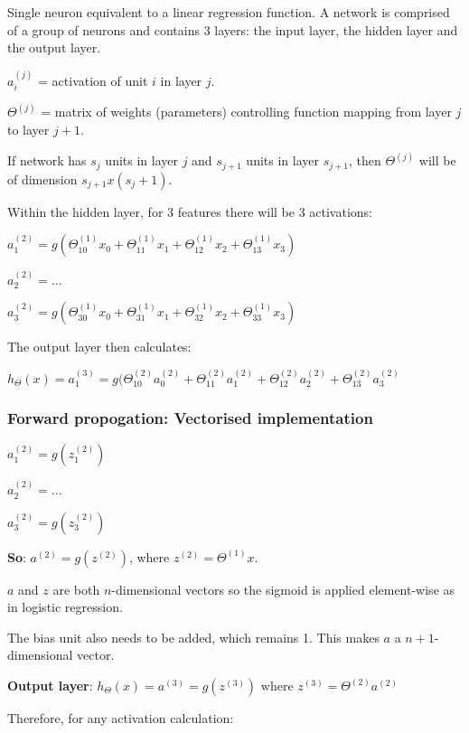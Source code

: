 \documentclass[12pt] {article}
\begin{document}
    Single neuron equivalent to a linear regression function. A network is
    comprised of a group of neurons and contains 3 layers: the input layer, 
    the hidden layer and the output layer.

    $a_i^{(j)}$ = activation of unit $i$ in layer $j$. 

    $\Theta^{(j)}$ = matrix of weights (parameters) controlling function
    mapping from layer $j$ to layer $j+1$.

    If network has $s_j$ units in layer $j$ and $s_{j+1}$ units in layer
    $s_{j+1}$, then $\Theta^{(j)}$ will be of dimension $s_{j+1} x (s_j + 1)$.

    Within the hidden layer, for 3 features there will be 3 activations:

    $a_1^{(2)} = g(\Theta_{10}^{(1)} x_0 + \Theta_{11}^{(1)} x_1 + 
    \Theta_{12}^{(1)} x_2 + \Theta_{13}^{(1)} x_3)$

    $a_2^{(2)} = \dots$

    $a_3^{(2)} = g(\Theta_{30}^{(1)} x_0 + \Theta_{31}^{(1)} x_1 + 
    \Theta_{32}^{(1)} x_2 + \Theta_{33}^{(1)} x_3)$

    The output layer then calculates: 

    $h_\Theta(x) = a_1^{(3)} = g(\Theta_{10}^{(2)}a_0^{(2)} + 
    \Theta_{11}^{(2)}a_1^{(2)} + \Theta_{12}^{(2)}a_2^{(2)} +
    \Theta_{13}^{(2)}a_3^{(2)}$ 

    \subsubsection{Forward propogation: Vectorised implementation}
    
      $a_1^{(2)} = g(z_1^{(2)})$
      
      $a_2^{(2)} = \dots$

      $a_3^{(2)} = g(z_3^{(2)})$

      \textbf{So}: $a^{(2)} = g(z^{(2)})$, where $z^{(2)} = \Theta^{(1)}x$.

      $a$ and $z$ are both $n$-dimensional vectors so the sigmoid is applied 
      element-wise as in logistic regression.

      The bias unit also needs to be added, which remains 1. This makes $a$ a
      $n+1$-dimensional vector. 

      \textbf{Output layer}: $h_\Theta(x) = a^{(3)} = g(z^{(3)}) \text{ where }
      z^{(3)} = \Theta^{(2)}a^{(2)}$ 

      Therefore, for any activation calculation: 
      
\end{document}
